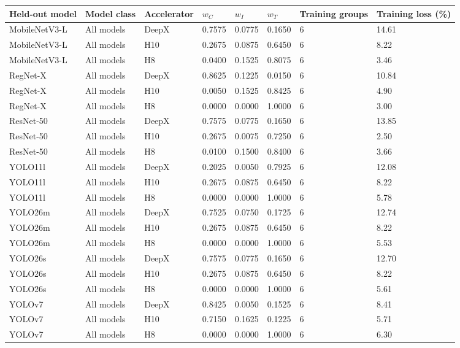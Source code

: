 \begin{tabular}{@{}llllllll@{}}
\toprule
Held-out model & Model class & Accelerator & $w_C$ & $w_I$ & $w_T$ & Training groups & Training loss (\%) \\
\midrule
MobileNetV3-L & All models & DeepX & 0.7575 & 0.0775 & 0.1650 & 6 & 14.61 \\
MobileNetV3-L & All models & H10 & 0.2675 & 0.0875 & 0.6450 & 6 & 8.22 \\
MobileNetV3-L & All models & H8 & 0.0400 & 0.1525 & 0.8075 & 6 & 3.46 \\
RegNet-X & All models & DeepX & 0.8625 & 0.1225 & 0.0150 & 6 & 10.84 \\
RegNet-X & All models & H10 & 0.0050 & 0.1525 & 0.8425 & 6 & 4.90 \\
RegNet-X & All models & H8 & 0.0000 & 0.0000 & 1.0000 & 6 & 3.00 \\
ResNet-50 & All models & DeepX & 0.7575 & 0.0775 & 0.1650 & 6 & 13.85 \\
ResNet-50 & All models & H10 & 0.2675 & 0.0075 & 0.7250 & 6 & 2.50 \\
ResNet-50 & All models & H8 & 0.0100 & 0.1500 & 0.8400 & 6 & 3.66 \\
YOLO11l & All models & DeepX & 0.2025 & 0.0050 & 0.7925 & 6 & 12.08 \\
YOLO11l & All models & H10 & 0.2675 & 0.0875 & 0.6450 & 6 & 8.22 \\
YOLO11l & All models & H8 & 0.0000 & 0.0000 & 1.0000 & 6 & 5.78 \\
YOLO26m & All models & DeepX & 0.7525 & 0.0750 & 0.1725 & 6 & 12.74 \\
YOLO26m & All models & H10 & 0.2675 & 0.0875 & 0.6450 & 6 & 8.22 \\
YOLO26m & All models & H8 & 0.0000 & 0.0000 & 1.0000 & 6 & 5.53 \\
YOLO26s & All models & DeepX & 0.7575 & 0.0775 & 0.1650 & 6 & 12.70 \\
YOLO26s & All models & H10 & 0.2675 & 0.0875 & 0.6450 & 6 & 8.22 \\
YOLO26s & All models & H8 & 0.0000 & 0.0000 & 1.0000 & 6 & 5.61 \\
YOLOv7 & All models & DeepX & 0.8425 & 0.0050 & 0.1525 & 6 & 8.41 \\
YOLOv7 & All models & H10 & 0.7150 & 0.1625 & 0.1225 & 6 & 5.71 \\
YOLOv7 & All models & H8 & 0.0000 & 0.0000 & 1.0000 & 6 & 6.30 \\
\bottomrule
\end{tabular}
